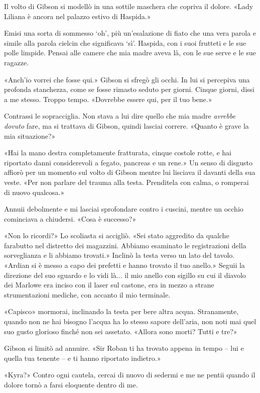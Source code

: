 Il volto di Gibson si modellò in una sottile maschera che copriva il
dolore. «Lady Liliana è ancora nel palazzo estivo di Haspida.»

Emisi una sorta di sommesso `oh', più un'esalazione di fiato che una
vera parola e simile alla parola cielcin che significava `sì'. Haspida,
con i suoi frutteti e le sue polle limpide. Pensai alle camere che mia
madre aveva là, con le sue serve e le sue ragazze.

«Anch'io vorrei che fosse qui.» Gibson si sfregò gli occhi. In lui si
percepiva una profonda stanchezza, come se fosse rimasto seduto per
giorni. Cinque giorni, dissi a me stesso. Troppo tempo. «Dovrebbe essere
qui, per il tuo bene.»

Contrassi le sopracciglia. Non stava a lui dire quello che mia madre
\emph{avrebbe dovuto} fare, ma si trattava di Gibson, quindi lasciai
correre. «Quanto è grave la mia situazione?»

«Hai la mano destra completamente fratturata, cinque costole rotte, e
hai riportato danni considerevoli a fegato, pancreas e un rene.» Un
senso di disgusto affiorò per un momento sul volto di Gibson mentre lui
lisciava il davanti della sua veste. «Per non parlare del trauma alla
testa. Prenditela con calma, o romperai di nuovo qualcosa.»

Annuii debolmente e mi lasciai sprofondare contro i cuscini, mentre un
occhio cominciava a chiudersi. «Cosa è successo?»

«Non lo ricordi?» Lo scoliasta si accigliò. «Sei stato aggredito da
qualche farabutto nel distretto dei magazzini. Abbiamo esaminato le
registrazioni della sorveglianza e li abbiamo trovati.» Inclinò la testa
verso un lato del tavolo. «Ardian si è messo a capo dei prefetti e hanno
trovato il tuo anello.» Seguii la direzione del suo sguardo e lo vidi
là... il mio anello con sigillo su cui il diavolo dei Marlowe era inciso
con il laser sul castone, era in mezzo a strane strumentazioni mediche,
con accanto il mio terminale.

«Capisco» mormorai, inclinando la testa per bere altra acqua.
Stranamente, quando non ne hai bisogno l'acqua ha lo stesso sapore
dell'aria, non noti mai quel suo gusto glorioso finché non sei assetato.
«Allora sono morti? Tutti e tre?»

Gibson si limitò ad annuire. «Sir Roban ti ha trovato appena in tempo --
lui e quella tua tenente -- e ti hanno riportato indietro.»

«Kyra?» Contro ogni cautela, cercai di nuovo di sedermi e me ne pentii
quando il dolore tornò a farsi eloquente dentro di me.

